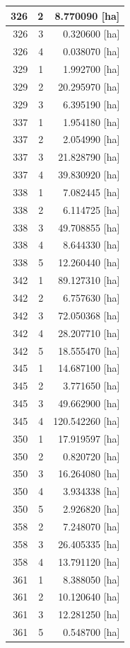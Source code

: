 \documentclass[11pt,]{book}
\begin{document}
\begin{table}
\begin{tabular}[t]{r|r|r}
\hline
326 & 2 & 8.770090 [ha]\\
\hline
326 & 3 & 0.320600 [ha]\\
\hline
326 & 4 & 0.038070 [ha]\\
\hline
329 & 1 & 1.992700 [ha]\\
\hline
329 & 2 & 20.295970 [ha]\\
\hline
329 & 3 & 6.395190 [ha]\\
\hline
337 & 1 & 1.954180 [ha]\\
\hline
337 & 2 & 2.054990 [ha]\\
\hline
337 & 3 & 21.828790 [ha]\\
\hline
337 & 4 & 39.830920 [ha]\\
\hline
338 & 1 & 7.082445 [ha]\\
\hline
338 & 2 & 6.114725 [ha]\\
\hline
338 & 3 & 49.708855 [ha]\\
\hline
338 & 4 & 8.644330 [ha]\\
\hline
338 & 5 & 12.260440 [ha]\\
\hline
342 & 1 & 89.127310 [ha]\\
\hline
342 & 2 & 6.757630 [ha]\\
\hline
342 & 3 & 72.050368 [ha]\\
\hline
342 & 4 & 28.207710 [ha]\\
\hline
342 & 5 & 18.555470 [ha]\\
\hline
345 & 1 & 14.687100 [ha]\\
\hline
345 & 2 & 3.771650 [ha]\\
\hline
345 & 3 & 49.662900 [ha]\\
\hline
345 & 4 & 120.542260 [ha]\\
\hline
350 & 1 & 17.919597 [ha]\\
\hline
350 & 2 & 0.820720 [ha]\\
\hline
350 & 3 & 16.264080 [ha]\\
\hline
350 & 4 & 3.934338 [ha]\\
\hline
350 & 5 & 2.926820 [ha]\\
\hline
358 & 2 & 7.248070 [ha]\\
\hline
358 & 3 & 26.405335 [ha]\\
\hline
358 & 4 & 13.791120 [ha]\\
\hline
361 & 1 & 8.388050 [ha]\\
\hline
361 & 2 & 10.120640 [ha]\\
\hline
361 & 3 & 12.281250 [ha]\\
\hline
361 & 5 & 0.548700 [ha]\\

\end{tabular}
\end{table}
\end{document}

